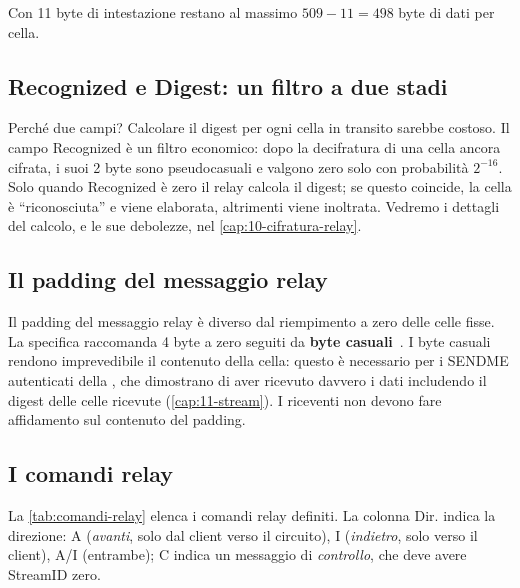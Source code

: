 Con 11 byte di intestazione restano al massimo $509 - 11 = 498$ byte di dati per cella.

\subsection{Recognized e Digest: un filtro a due stadi}

Perché due campi? Calcolare il digest per ogni cella in transito sarebbe costoso. Il campo Recognized è un filtro economico: dopo la decifratura di una cella ancora cifrata, i suoi 2 byte sono pseudocasuali e valgono zero solo con probabilità $2^{-16}$. Solo quando Recognized è zero il relay calcola il digest; se questo coincide, la cella è \enquote{riconosciuta} e viene elaborata, altrimenti viene inoltrata. Vedremo i dettagli del calcolo, e le sue debolezze, nel \cref{cap:10-cifratura-relay}.

\subsection{Il padding del messaggio relay}

Il padding del messaggio relay è diverso dal riempimento a zero delle celle fisse. La specifica raccomanda 4 byte a zero seguiti da \textbf{byte casuali}~. I byte casuali rendono imprevedibile il contenuto della cella: questo è necessario per i SENDME autenticati della , che dimostrano di aver ricevuto davvero i dati includendo il digest delle celle ricevute (\cref{cap:11-stream}). I riceventi non devono fare affidamento sul contenuto del padding.

\subsection{I comandi relay}

La \cref{tab:comandi-relay} elenca i comandi relay definiti. La colonna Dir. indica la direzione: A (\emph{avanti}, solo dal client verso il circuito), I (\emph{indietro}, solo verso il client), A/I (entrambe); C indica un messaggio di \emph{controllo}, che deve avere StreamID zero.


